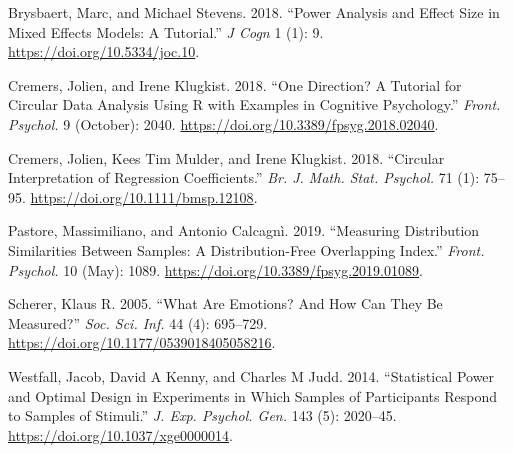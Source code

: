\documentclass[
]{article}
\newlength{\cslhangindent}
\newlength{\cslentryspacingunit} %
\newenvironment{CSLReferences}[2] %
 {%
  \setlength{\parindent}{0pt}
  \ifodd #1
  \let\oldpar\par
  \def\par{\hangindent=\cslhangindent\oldpar}
  \fi
  \setlength{\parskip}{#2\cslentryspacingunit}
 }%
 {}
\begin{document}
\hypertarget{refs}{}
\begin{CSLReferences}{1}{0}
\leavevmode{}%
Brysbaert, Marc, and Michael Stevens. 2018. {``Power Analysis and Effect Size in Mixed Effects Models: A Tutorial.''} \emph{J Cogn} 1 (1): 9. \url{https://doi.org/10.5334/joc.10}.

\leavevmode{}%
Cremers, Jolien, and Irene Klugkist. 2018. {``One Direction? A Tutorial for Circular Data Analysis Using {R} with Examples in Cognitive Psychology.''} \emph{Front. Psychol.} 9 (October): 2040. \url{https://doi.org/10.3389/fpsyg.2018.02040}.

\leavevmode{}%
Cremers, Jolien, Kees Tim Mulder, and Irene Klugkist. 2018. {``Circular Interpretation of Regression Coefficients.''} \emph{Br. J. Math. Stat. Psychol.} 71 (1): 75--95. \url{https://doi.org/10.1111/bmsp.12108}.

\leavevmode{}%
Pastore, Massimiliano, and Antonio Calcagnì. 2019. {``Measuring Distribution Similarities Between Samples: A {Distribution-Free} Overlapping Index.''} \emph{Front. Psychol.} 10 (May): 1089. \url{https://doi.org/10.3389/fpsyg.2019.01089}.

\leavevmode{}%
Scherer, Klaus R. 2005. {``What Are Emotions? And How Can They Be Measured?''} \emph{Soc. Sci. Inf.} 44 (4): 695--729. \url{https://doi.org/10.1177/0539018405058216}.

\leavevmode{}%
Westfall, Jacob, David A Kenny, and Charles M Judd. 2014. {``Statistical Power and Optimal Design in Experiments in Which Samples of Participants Respond to Samples of Stimuli.''} \emph{J. Exp. Psychol. Gen.} 143 (5): 2020--45. \url{https://doi.org/10.1037/xge0000014}.

\end{CSLReferences}
\end{document}
